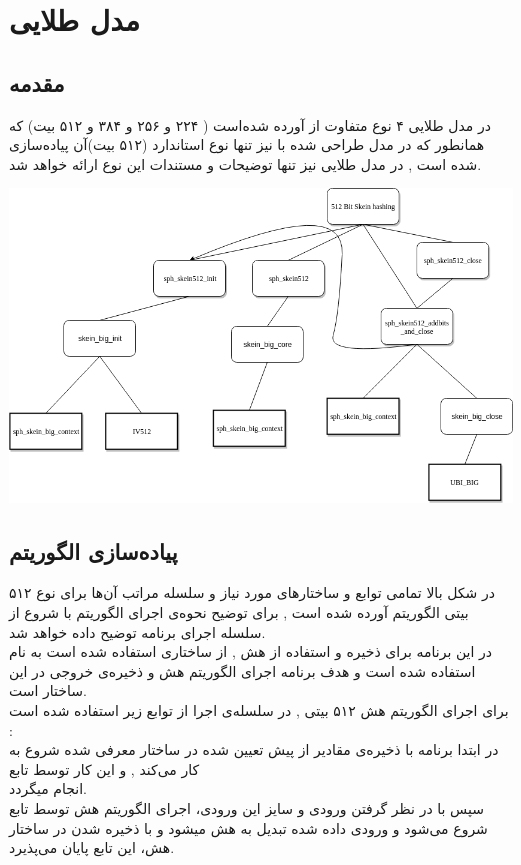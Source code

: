 \chapter{مدل طلایی}
\section{مقدمه}
در مدل‌ طلایی ۴ نوع متفاوت از  آورده شده‌است (‌ ۲۲۴ و ۲۵۶ و ۳۸۴ و ۵۱۲  بیت) که همانطور که در مدل  طراحی شده با  نیز تنها نوع استاندارد  (۵۱۲ بیت)آن پیاده‌سازی شده است , در مدل‌ طلایی نیز تنها توضیحات و مستندات این نوع ارائه خواهد شد.
\\
\begin{center}
	\includegraphics[width=14cm]{images/GoldenModel.png}
\end{center}

\section{پیاده‌سازی الگوریتم}
در شکل بالا تمامی توابع و ساختارهای مورد نیاز  و سلسله مراتب آن‌ها برای نوع ۵۱۲ بیتی الگوریتم آورده شده است , برای توضیح نحوه‌ی اجرای الگوریتم با شروع از  
 سلسله اجرای برنامه توضیح داده خواهد شد.
\\
در این برنامه برای ‌ذخیره و استفاده از هش , از ساختاری استفاده شده است به نام \hyperref[subsec:sph-skein-big-context]{} استفاده شده است و هدف برنامه اجرای الگوریتم هش و ذخیره‌ی خروجی در این ساختار است.
\\
برای اجرای الگوریتم هش ۵۱۲ بیتی , در سلسله‌ی اجرا از توابع زیر استفاده شده است :
\\
در ابتدا برنامه با ذخیره‌ی مقادیر از پیش تعیین شده  \hyperref[subsec:IV512]{} در ساختار معرفی شده شروع به کار می‌کند , و این کار توسط تابع\\
\hyperref[subsec:sph-skein512-init]{}
  انجام میگردد.
  \\ سپس با در نظر گرفتن ورودی و سایز این ورودی، اجرای الگوریتم هش  توسط تابع \hyperref[subsec:sph-skein512]{}
   شروع می‌شود و ورودی داده شده تبدیل به هش میشود و با ذخیره شدن در ساختار  هش، این تابع پایان می‌پذیرد.
  \\ 
  
  


